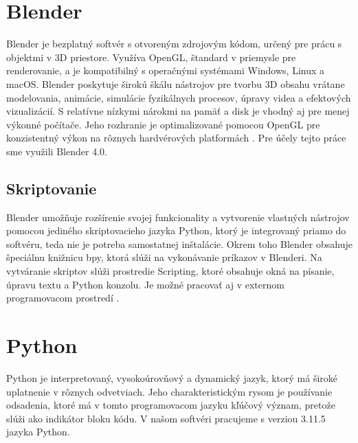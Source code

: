 \section{Blender}
Blender je bezplatný softvér s otvoreným zdrojovým kódom, určený pre prácu s objektmi v 3D priestore. Využíva OpenGL, štandard v priemysle pre renderovanie, a je kompatibilný s operačnými systémami Windows, Linux a macOS. 
Blender poskytuje širokú škálu nástrojov pre tvorbu 3D obsahu vrátane modelovania, animácie, simulácie fyzikálnych procesov, úpravy videa a efektových vizualizácií. S relatívne nízkymi nárokmi na pamäť a disk je vhodný aj pre menej výkonné počítače. Jeho rozhranie je optimalizované pomocou OpenGL pre konzistentný výkon na rôznych hardvérových platformách \cite{Blender}. Pre účely tejto práce sme využili Blender 4.0.
\subsection{Skriptovanie}
Blender umožňuje rozšírenie svojej funkcionality a vytvorenie vlastných nástrojov pomocou jediného skriptovacieho jazyka Python, ktorý je integrovaný priamo do softvéru, teda nie je potreba samostatnej inštalácie. Okrem toho Blender obsahuje špeciálnu knižnicu bpy, ktorá slúži na vykonávanie príkazov v Blenderi. Na vytváranie skriptov slúži prostredie Scripting, ktoré obsahuje okná na písanie, úpravu textu a Python konzolu. Je možné pracovať aj v externom programovacom prostredí \cite{BlenderAPI}.
\section{Python}
Python je interpretovaný, vysokoúrovňový a dynamický jazyk, ktorý má široké uplatnenie v rôznych odvetviach. Jeho charakteristickým rysom je používanie odsadenia, ktoré má v tomto programovacom jazyku kľúčový význam, pretože slúži ako indikátor bloku kódu. V našom softvéri pracujeme s verziou 3.11.5 jazyka Python.

